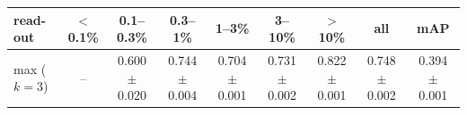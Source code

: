 \begin{tabular}{lcccccccc}
\toprule
read-out & $<$0.1\% & 0.1--0.3\% & 0.3--1\% & 1--3\% & 3--10\% & $>$10\% & all & mAP \\
\midrule
max ($k=3$) & -- & 0.600 $\pm$ 0.020 & 0.744 $\pm$ 0.004 & 0.704 $\pm$ 0.001 & 0.731 $\pm$ 0.002 & 0.822 $\pm$ 0.001 & 0.748 $\pm$ 0.002 & 0.394 $\pm$ 0.001 \\
\bottomrule
\end{tabular}
